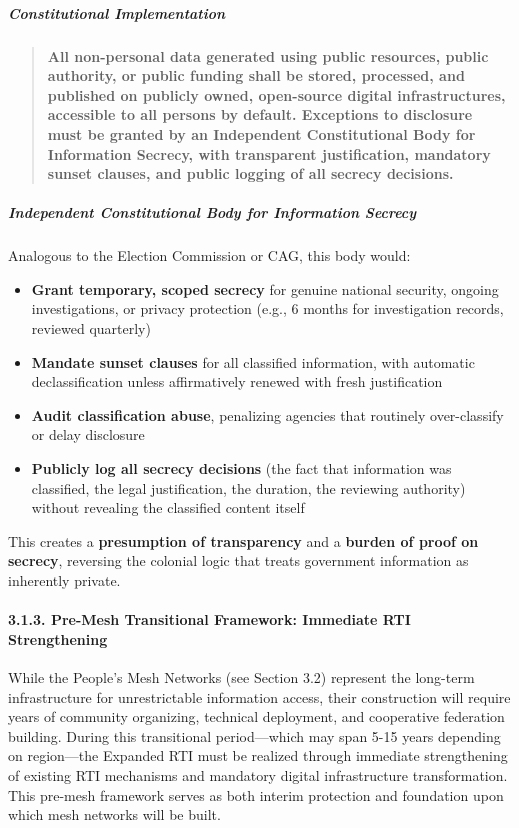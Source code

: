 \subparagraph{Constitutional
Implementation}\label{constitutional-implementation}

\begin{quote}
\textbf{All non-personal data generated using public resources, public
authority, or public funding shall be stored, processed, and published
on publicly owned, open-source digital infrastructures, accessible to
all persons by default. Exceptions to disclosure must be granted by an
Independent Constitutional Body for Information Secrecy, with
transparent justification, mandatory sunset clauses, and public logging
of all secrecy decisions.}
\end{quote}

\subparagraph{Independent Constitutional Body for Information
Secrecy}\label{independent-constitutional-body-for-information-secrecy}

Analogous to the Election Commission or CAG, this body would:

\begin{itemize}
\tightlist
\item
  \textbf{Grant temporary, scoped secrecy} for genuine national
  security, ongoing investigations, or privacy protection (e.g., 6
  months for investigation records, reviewed quarterly)
\item
  \textbf{Mandate sunset clauses} for all classified information, with
  automatic declassification unless affirmatively renewed with fresh
  justification
\item
  \textbf{Audit classification abuse}, penalizing agencies that
  routinely over-classify or delay disclosure
\item
  \textbf{Publicly log all secrecy decisions} (the fact that information
  was classified, the legal justification, the duration, the reviewing
  authority) without revealing the classified content itself
\end{itemize}

This creates a \textbf{presumption of transparency} and a \textbf{burden
of proof on secrecy}, reversing the colonial logic that treats
government information as inherently private.

\paragraph{3.1.3. Pre-Mesh Transitional Framework: Immediate RTI
Strengthening}\label{pre-mesh-transitional-framework-immediate-rti-strengthening}

While the People's Mesh Networks (see Section 3.2) represent the
long-term infrastructure for unrestrictable information access, their
construction will require years of community organizing, technical
deployment, and cooperative federation building. During this
transitional period---which may span 5-15 years depending on
region---the Expanded RTI must be realized through immediate
strengthening of existing RTI mechanisms and mandatory digital
infrastructure transformation. This pre-mesh framework serves as both
interim protection and foundation upon which mesh networks will be
built.

